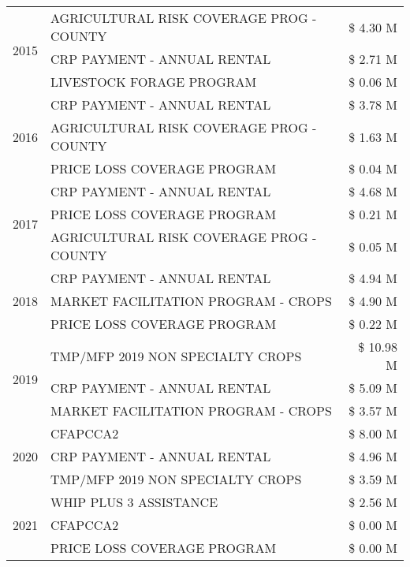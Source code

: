 \begin{tabular}{llr}
\multirow[t]{3}{*}{2015} & AGRICULTURAL RISK COVERAGE PROG - COUNTY & \$ 4.30 M \\
 & CRP PAYMENT - ANNUAL RENTAL & \$ 2.71 M \\
 & LIVESTOCK FORAGE PROGRAM & \$ 0.06 M \\
\cline{1-3}
\multirow[t]{3}{*}{2016} & CRP PAYMENT - ANNUAL RENTAL & \$ 3.78 M \\
 & AGRICULTURAL RISK COVERAGE PROG - COUNTY & \$ 1.63 M \\
 & PRICE LOSS COVERAGE PROGRAM & \$ 0.04 M \\
\cline{1-3}
\multirow[t]{3}{*}{2017} & CRP PAYMENT - ANNUAL RENTAL & \$ 4.68 M \\
 & PRICE LOSS COVERAGE PROGRAM & \$ 0.21 M \\
 & AGRICULTURAL RISK COVERAGE PROG - COUNTY & \$ 0.05 M \\
\cline{1-3}
\multirow[t]{3}{*}{2018} & CRP PAYMENT - ANNUAL RENTAL & \$ 4.94 M \\
 & MARKET FACILITATION PROGRAM - CROPS & \$ 4.90 M \\
 & PRICE LOSS COVERAGE PROGRAM & \$ 0.22 M \\
\cline{1-3}
\multirow[t]{3}{*}{2019} & TMP/MFP 2019 NON SPECIALTY CROPS & \$ 10.98 M \\
 & CRP PAYMENT - ANNUAL RENTAL & \$ 5.09 M \\
 & MARKET FACILITATION PROGRAM - CROPS & \$ 3.57 M \\
\cline{1-3}
\multirow[t]{3}{*}{2020} & CFAPCCA2 & \$ 8.00 M \\
 & CRP PAYMENT - ANNUAL RENTAL & \$ 4.96 M \\
 & TMP/MFP 2019 NON SPECIALTY CROPS & \$ 3.59 M \\
\cline{1-3}
\multirow[t]{3}{*}{2021} & WHIP PLUS 3 ASSISTANCE & \$ 2.56 M \\
 & CFAPCCA2 & \$ 0.00 M \\
 & PRICE LOSS COVERAGE PROGRAM & \$ 0.00 M \\
\cline{1-3}
\bottomrule
\end{tabular}
